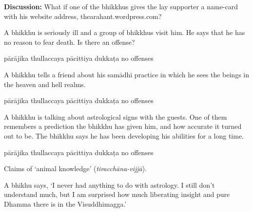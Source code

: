 \begin{exam}{\autoExamName}
\begin{problem*}
\begin{parts}
  \bigskip

  \textbf{Discussion:} What if one of the bhikkhus gives the lay supporter a
  name-card with his website address, thearahant.wordpress.com?

  \bigskip

\item A bhikkhu is seriously ill and a group of bhikkhus visit him. He says that
  he has no reason to fear death. Is there an offense?

  \bigskip

  \begin{answers}{5}
    \bChoices
     pārājika\eAns
     thullaccaya\eAns
     pācittiya\eAns
     dukkaṭa\eAns
     no offenses\eAns
    \eChoices
  \end{answers}

  \bigskip

\item A bhikkhu tells a friend about his samādhi practice in which he sees the
  beings in the heaven and hell realms.

  \bigskip

  \begin{answers}{5}
    \bChoices
     pārājika\eAns
     thullaccaya\eAns
     pācittiya\eAns
     dukkaṭa\eAns
     no offenses\eAns
    \eChoices
  \end{answers}

  \bigskip

\item A bhikkhu is talking about astrological signs with the guests. One of them
  remembers a prediction the bhikkhu has given him, and how accurate it turned
  out to be. The bhikkhu says he has been developing his abilities for a long time.

  \bigskip

  \begin{answers}{5}
    \bChoices
     pārājika\eAns
     thullaccaya\eAns
     pācittiya\eAns
     dukkaṭa\eAns
     no offenses\eAns
    \eChoices
  \end{answers}

  \begin{solution}
    Claims of `animal knowledge' (\emph{tiracchāna-vijjā}).
  \end{solution}

  \bigskip

\item A bhikhu says, `I never had anything to do with astrology.
  I still don't understand much, but I am surprised how much liberating insight
  and pure Dhamma there is in the Visuddhimagga.'


\end{parts}
\end{problem*}
\end{exam}
